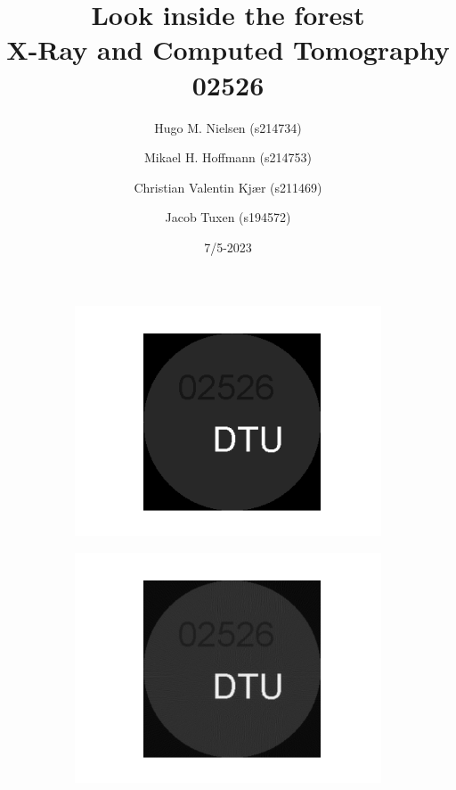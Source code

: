 \documentclass{article}
\title{
    Look inside the forest \\
    \large X-Ray and Computed Tomography \\
    02526
}
\author{Hugo M. Nielsen (s214734) \and Mikael H. Hoffmann (s214753) \and Christian Valentin Kjær (s211469) \and Jacob Tuxen (s194572)}
\date{7/5-2023}
\begin{document}
\maketitle\thispagestyle{empty}

\begin{figure}[H]
\centering
\begin{subfigure}[t]{0.3\linewidth}
\centering
\includegraphics[width=\linewidth]{code/test_logo.png}
\end{subfigure}
\begin{subfigure}[t]{0.4\linewidth}
\centering
\includegraphics[width=\linewidth]{code/test_logo_recov.png}
\end{subfigure}
\begin{subfigure}[t]{0.5\linewidth}

\end{subfigure}
\end{figure}
\end{document}
